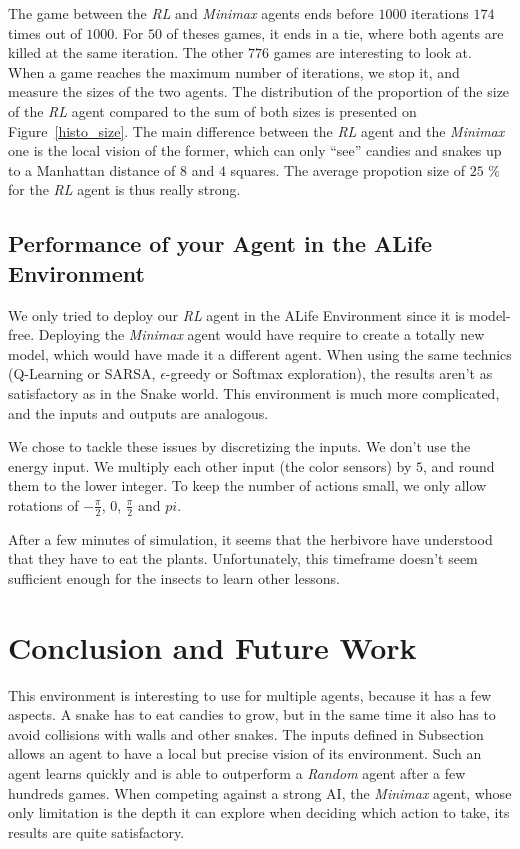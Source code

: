\documentclass[journal, a4paper]{IEEEtran}
\begin{document}
The game between the \emph{RL} and \emph{Minimax} agents ends before $1000$ iterations $174$ times out of $1000$.
For $50$ of theses games, it ends in a tie, where both agents are killed at the same iteration.
The other $776$ games are interesting to look at.
When a game reaches the maximum number of iterations, we stop it, and measure the sizes of the two agents.
The distribution of the proportion of the size of the \emph{RL} agent compared to the sum of both sizes is presented on Figure~\ref{histo_size}.
The main difference between the \emph{RL} agent and the \emph{Minimax} one is the local vision of the former, which can only ``see'' candies and snakes up to a Manhattan distance of $8$ and $4$ squares.
The average propotion size of $25$ \% for the \emph{RL} agent is thus really strong.

\subsection{Performance of your Agent in the ALife Environment}

We only tried to deploy our \emph{RL} agent in the ALife Environment since it is model-free.
Deploying the \emph{Minimax} agent would have require to create a totally new model, which would have made it a different agent.
When using the same technics (Q-Learning or SARSA, $\epsilon$-greedy or Softmax exploration), the results aren't as satisfactory as in the Snake world.
This environment is much more complicated, and the inputs and outputs are analogous.

We chose to tackle these issues by discretizing the inputs.
We don't use the energy input.
We multiply each other input (the color sensors) by $5$, and round them to the lower integer.
To keep the number of actions small, we only allow rotations of $-\frac{\pi}{2}$, $0$, $\frac{\pi}{2}$ and $pi$.

After a few minutes of simulation, it seems that the herbivore have understood that they have to eat the plants.
Unfortunately, this timeframe doesn't seem sufficient enough for the insects to learn other lessons.

\section{Conclusion and Future Work}
    This environment is interesting to use for multiple agents, because it has a few aspects.
    A snake has to eat candies to grow, but in the same time it also has to avoid collisions with walls and other snakes.
    The inputs defined in Subsection~\cite{rl_agent} allows an agent to have a local but precise vision of its environment.
    Such an agent learns quickly and is able to outperform a \emph{Random} agent after a few hundreds games.
    When competing against a strong AI, the \emph{Minimax} agent, whose only limitation is the depth it can explore when deciding which action to take, its results are quite satisfactory.
\end{document}
